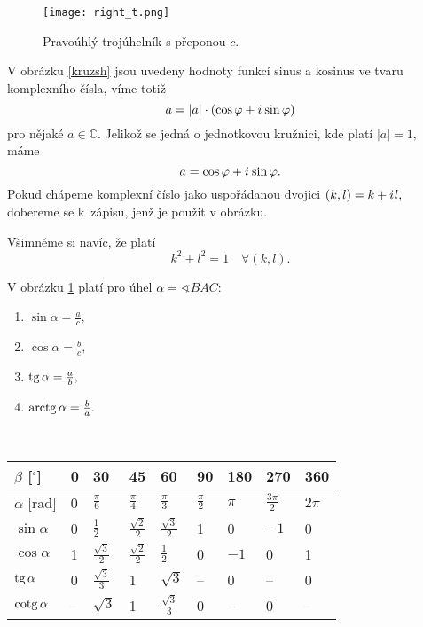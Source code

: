 \begin{figure}[ht!]
     \centering
     \texttt{[image: right\_t.png]}
     \caption{Pravoúhlý trojúhelník s přeponou $c.$}
     \label{prav_t}
\end{figure}

\pagebreak

\begin{pozn}
    \par V obrázku \ref{kruzsh} jsou uvedeny hodnoty funkcí sinus a kosinus ve tvaru
    komplexního čísla, víme totiž
    $$ a = | a | \cdot (\cos \varphi + i\mkern1mu \sin \varphi)$$
    pro nějaké $a \in \mathbb C.$ Jelikož se jedná o jednotkovou kružnici, kde platí
    $|a| = 1,$ máme
    $$a=\cos \varphi +i\mkern1mu \sin \varphi. $$
    Pokud chápeme komplexní číslo jako uspořádanou dvojici $(k,l)=k+i\mkern1mu l,$
    dobereme se k~zápisu, jenž je použit v obrázku.
    \par Všimněme si navíc, že platí
    $$k^2+l^2=1 \,\,\,\,\,\, \forall (k,l).$$
\end{pozn}

\begin{pozn}
    V obrázku \ref{prav_t} platí pro úhel $\alpha = \sphericalangle BAC:$
    \begin{enumerate}[$i.$]
        \item $\sin \alpha= \frac{a}{c},$
        \item $\cos \alpha= \frac{b}{c},$
        \item $\operatorname{tg} \alpha= \frac{a}{b},$
        \item $\operatorname{arctg} \alpha= \frac{b}{a}.$
    \end{enumerate}
\end{pozn}

\begin{pozn}\,\\
    \begin{tabularx}{\textwidth}{| p{} || p{} | p{} |
    p{} | p{} | p{} | p{} | p{}
    | p{} |}
    \hline
    $\beta$ [$^\circ$] & 0 & 30 & 45 & 60 & 90 & 180 & 270 & 360 \\
    \hline
    $\alpha$ [rad] & 0 & $\frac{\pi}{6}$ & $\frac{\pi}{4}$ & $\frac{\pi}{3}$ & $\frac{\pi}{2}$ & $\pi$ & $\frac{3\pi}{2}$ & $2\pi$\\
    \hline
    $\sin \alpha$ & 0 & $\frac{1}{2}$ & $\frac{\sqrt{2}}{2}$ & $\frac{\sqrt{3}}{2}$ & 1 & 0 & $-1$ & 0\\
    \hline
    $\cos \alpha$ & 1 & $\frac{\sqrt{3}}{2}$ & $\frac{\sqrt{2}}{2}$ & $\frac{1}{2}$ & 0 & $-1$ & 0 & 1\\
    \hline
    $\operatorname{tg} \alpha$ & 0 & $\frac{\sqrt{3}}{3}$ & 1 & $\sqrt{3}$ & -- & 0 & -- & 0\\
    \hline
    $\operatorname{cotg} \alpha$ & -- & $\sqrt{3}$ & 1 & $\frac{\sqrt{3}}{3}$ & 0 & -- & 0 & --\\
    \hline
    \end{tabularx}
\end{pozn}

